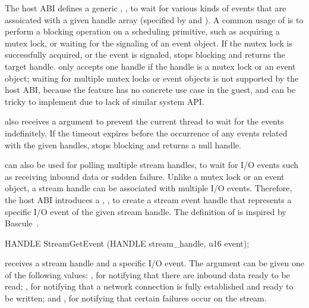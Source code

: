 The host ABI defines a generic \hostapi{},
, to wait for various kinds of events that are assoicated 
with a given handle array (specified by  and ).
A common usage of 
is to perform a blocking operation on a scheduling primitive,
such as acquiring a mutex lock,
or waiting for the signaling of an event object.
If the mutex lock is successfully acquired, or the event is signaled,
 stops blocking
and returns the target handle. 
 only accepts one handle if
the handle is a mutex lock or an event object;
waiting for multiple mutex locks or event objects is not supported by the host ABI,
because the feature has no concrete use case in the guest,
and can be tricky to implement due to lack of similar system API.



 also receives a  argument to prevent the current thread to wait for the events indefinitely.
If the timeout expires before the occurrence of any events related with the given handles,
 stops blocking
and returns a null handle.


 can also be used for polling multiple stream handles, to wait for I/O events
such as receiving inbound data or sudden failure.
Unlike a mutex lock or an event object, a stream handle can be associated
with multiple I/O events.
Therefore, the host ABI introduces a \hostapi{}, , to create a stream event handle
that represents a specific I/O event of the given stream handle.
The definition of  is inspired by Bascule~\cite{baumann13bascule}.


\begin{paldef}
HANDLE StreamGetEvent (HANDLE stream_handle, u16 event);
\end{paldef}


 receives a stream handle and a specific I/O event.
The  argument can be given
one of the following values:
, for notifying that there are inbound data ready to be read;
, for notifying
that a network connection is fully established
and ready to be written;
and , for notifying that certain failures occur on the stream.

